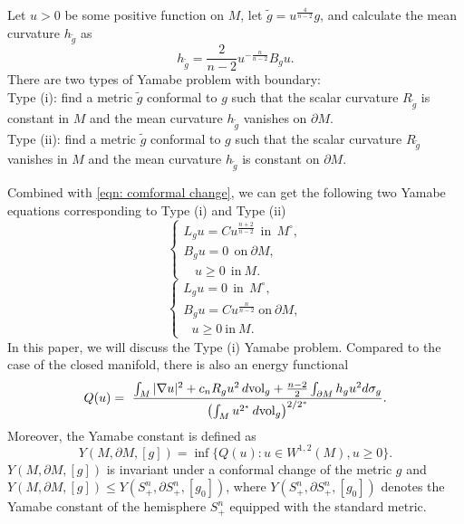 \documentclass[12pt]{amsart}
\newcommand{\na}{{\nabla}}
\newcommand{\vol}{{\rm{vol}}}
\begin{document}
   Let $u>0$ be some positive function on $M$, let $\tilde{g}= u^\frac{4}{n-2}g$, and calculate the mean curvature $h_{\tilde{g}}$ as 
   \begin{equation}
       h_{\tilde{g}}=\frac{2}{n-2}u^{-\frac{n}{n-2}}B_g u.
   \end{equation}
   There are two types of Yamabe problem with boundary:\\
   Type (i)\cite{Es92a}: find a metric $\tilde{g}$ conformal to $g$ such that the scalar curvature $R_{\tilde{g}}$ is constant in $M$ and the mean curvature $h_{\tilde{g}}$ vanishes on $\partial M$.\\
   Type (ii)\cite{Es92b}: find a metric $\tilde{g}$ conformal to $g$ such that the scalar curvature $R_{\tilde{g}}$ vanishes in $M$ and the mean curvature $h_{\tilde{g}}$ is constant on $\partial M$.
   
   
   
   Combined with \eqref{eqn: comformal change}, we can get the following two Yamabe equations corresponding to Type (i) and Type (ii)
   \begin{equation}\label{eqn:boundary}
       \begin{cases}
           L_g u= C u^\frac{n+2}{n-2}  ~~ \text{in}  ~~M^\circ  ,\\
       B_g u= 0   ~ ~\text{on}  ~\partial M,\\
       ~~~~u\geq 0  ~~\text{in}~ M. 
       \end{cases}
    \end{equation}
    \begin{equation}
       \begin{cases}
           L_g u=0 ~~ \text{in}  ~~M^\circ  ,\\
       B_g u= C u^\frac{n}{n-2}   ~ \text{on}  ~\partial M,\\
       ~~~u \geq  0 ~\text{in} ~ M.
       \end{cases}
    \end{equation}
    In this paper, we will discuss the Type (i) Yamabe problem. Compared to the case of the closed manifold, there is also an energy functional
    \begin{equation}
        Q(u) =
\ \frac{ \int_M  |\na u|^2 + c_nR_g u^2 \, d\vol_g+ \frac{n-2}{2}\int_{\partial M}h_g u^2 d \sigma_g}
  {\left(\int_M u^{2^*}\, d\vol_g\right)^{2/2^*}}.
    \end{equation}
    Moreover, the Yamabe constant is defined as
    \begin{equation}
        Y(M,\partial M, [g])=\inf\{Q(u):u\in W^{1,2}(M), u\ge0\}.
    \end{equation}
    $Y(M,\partial M, [g])$ is invariant under a conformal change of the metric $g$ and $Y(M,\partial M, [g]) \leq Y(S^n_+,\partial S^n_+,[g_0])$, where $Y(S^n_+,\partial S^n_+,[g_0])$ denotes the Yamabe constant
    of the hemisphere $S^n_+$ equipped with the standard metric.
\end{document}
